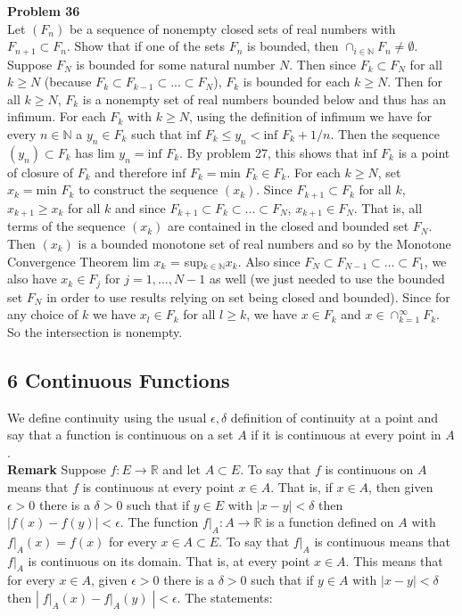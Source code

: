 \documentclass[a4paper]{article}
\begin{document}
{\bf Problem 36}\\
Let $(F_n)$ be a sequence of nonempty closed sets of real numbers with $F_{n+1} \subset F_n$. Show that if one of the sets $F_n$ is bounded, then $\cap_{i \in \mathbb{N}} F_n \neq \emptyset$. \\

Suppose $F_N$ is bounded for some natural number $N$. Then since $F_k \subset F_N$ for all $k\geq N$ (because $F_k \subset F_{k-1} \subset ... \subset F_N$), $F_k$ is bounded for each $k \geq N$. Then for all $k\geq N$, $F_k$ is a nonempty set of real numbers bounded below and thus has an infimum. For each $F_k$ with $k \geq N$, using the definition of infimum we have for every $n \in \mathbb{N}$ a $y_n \in F_k$ such that $\text{inf } F_k \leq y_n < \text{inf } F_k + 1/n$. Then the sequence $(y_n) \subset F_k$ has lim $y_n = \text{inf } F_k$. By problem 27, this shows that $\text{inf } F_k$ is a point of closure of $F_k$ and therefore $\text{inf } F_k = \text{min } F_k \in F_k$. For each $k\geq N$, set $x_k = \text{min } F_k$ to construct the sequence $(x_k)$. Since $F_{k+1} \subset F_{k}$ for all $k$, $x_{k+1} \geq x_k$ for all $k$ and since $F_{k+1} \subset F_{k} \subset ... \subset F_N$, $x_{k+1} \in F_N$. That is, all terms of  the sequence $(x_k)$ are contained in the closed and bounded set $F_N$. Then $(x_k)$ is a bounded monotone set of real numbers and so by the Monotone Convergence Theorem lim $x_k$ = sup$_{k \in \mathbb{N}} x_k$. Also since $F_N \subset F_{N-1} \subset ... \subset F_1$, we also have $x_k \in F_j$ for $j = 1,...,N-1$ as well (we just needed to use the bounded set $F_N$ in order to use results relying on set being closed and bounded). Since for any choice of $k$ we have $x_l \in F_k$ for all $l \geq k$, we have $x\in F_k$ and $x \in \cap_{k=1}^\infty F_k$. So the intersection is nonempty.

\subsection*{6 Continuous Functions}

We define continuity using the usual $\epsilon, \delta$ definition of continuity at a point and say that a function is continuous on a set $A$ if it is continuous at every point in $A$. \\

{\bf Remark} Suppose $f : E \rightarrow \mathbb{R}$ and let $A\subset E$. To say that $f$ is continuous on $A$ means that $f$ is continuous at every point $x \in A$. That is, if $x \in A$, then given $\epsilon > 0$  there is a $\delta > 0$ such that if $y \in E$ with $|x-y|<\delta$ then $|f(x) - f(y)| < \epsilon$. The function $f\rvert_A : A \rightarrow \mathbb{R}$ is a function defined on $A$ with $f\rvert_A(x) = f(x)$ for every $x \in A \subset E$. To say that $f\rvert_A$ is continuous means that $f\rvert_A$ is continuous on its domain. That is, at every point $x \in A$. This means that for every $x \in A$, given $\epsilon > 0$ there is a $\delta > 0$ such that if $y \in A$ with $|x-y| < \delta$ then $|\;f\rvert_A(x) - f\rvert_A(y)\;| < \epsilon$. The statements:\\
\end{document}

